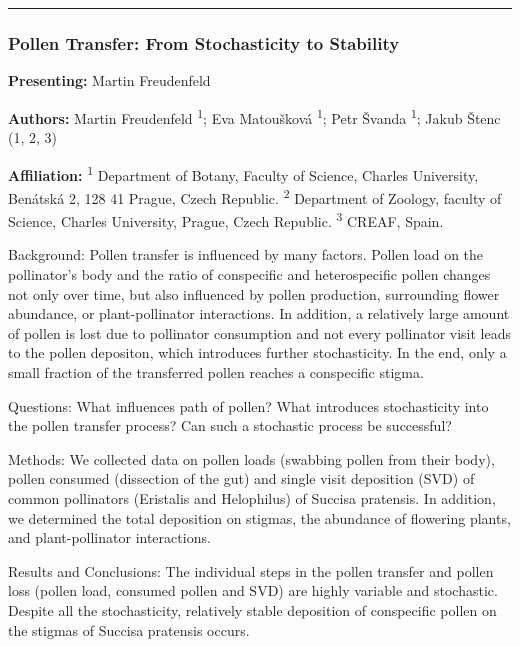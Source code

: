\documentclass[
  letterpaper,
  DIV=11,
  numbers=noendperiod]{scrartcl}
\begin{document}
\begin{center}\rule{0.5\linewidth}{0.5pt}\end{center}

\subsubsection{Pollen Transfer: From Stochasticity to
Stability}\label{pollen-transfer-from-stochasticity-to-stability}

\textbf{Presenting:} Martin Freudenfeld

\textbf{Authors:} Martin Freudenfeld \textsuperscript{1}; Eva Matoušková
\textsuperscript{1}; Petr Švanda \textsuperscript{1}; Jakub Štenc (1, 2,
3)

\textbf{Affiliation:} \textsuperscript{1} Department of Botany, Faculty
of Science, Charles University, Benátská 2, 128 41 Prague, Czech
Republic. \textsuperscript{2} Department of Zoology, faculty of Science,
Charles University, Prague, Czech Republic. \textsuperscript{3} CREAF,
Spain.

Background: Pollen transfer is influenced by many factors. Pollen load
on the pollinator's body and the ratio of conspecific and heterospecific
pollen changes not only over time, but also influenced by pollen
production, surrounding flower abundance, or plant-pollinator
interactions. In addition, a relatively large amount of pollen is lost
due to pollinator consumption and not every pollinator visit leads to
the pollen depositon, which introduces further stochasticity. In the
end, only a small fraction of the transferred pollen reaches a
conspecific stigma.

Questions: What influences path of pollen? What introduces stochasticity
into the pollen transfer process? Can such a stochastic process be
successful?

Methods: We collected data on pollen loads (swabbing pollen from their
body), pollen consumed (dissection of the gut) and single visit
deposition (SVD) of common pollinators (Eristalis and Helophilus) of
Succisa pratensis. In addition, we determined the total deposition on
stigmas, the abundance of flowering plants, and plant-pollinator
interactions.

Results and Conclusions: The individual steps in the pollen transfer and
pollen loss (pollen load, consumed pollen and SVD) are highly variable
and stochastic. Despite all the stochasticity, relatively stable
deposition of conspecific pollen on the stigmas of Succisa pratensis
occurs.
\end{document}
